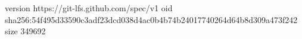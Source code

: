version https://git-lfs.github.com/spec/v1
oid sha256:54f495d33590c3adf23dcd038d4ac0b4b74b24017740264d64b8d309a473f242
size 349692
